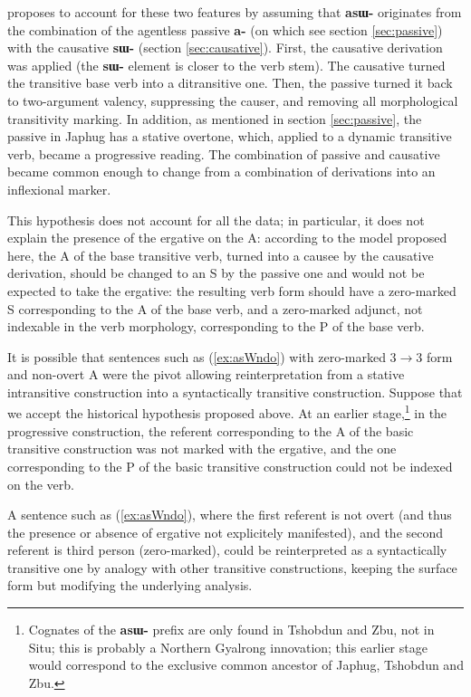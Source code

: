 \documentclass[oldfontcommands,oneside,a4paper,11pt]{article}
\newcommand{\ipa}[1]{\mbox{\phon\textbf{#1}}} %
\begin{document}
\citet{jacques16prog} proposes to account for these two features by assuming that \ipa{asɯ-} originates from the combination of the agentless passive \ipa{a-} (on which see section \ref{sec:passive}) with the causative \ipa{sɯ-} (section \ref{sec:causative}). First, the causative derivation was applied (the \ipa{sɯ-} element is closer to the verb stem). The causative turned the transitive base verb into a ditransitive one. Then, the passive turned it back to two-argument valency, suppressing the causer, and removing all morphological transitivity marking. In addition, as mentioned in section \ref{sec:passive}, the passive in Japhug  has a stative overtone, which, applied to a dynamic transitive verb, became a progressive reading. The combination of passive and causative became common enough to change from a combination of derivations into an inflexional marker.

This hypothesis does not account for all the data; in particular, it does not explain the presence of the ergative on the A: according to the model proposed here, the A of the base transitive verb, turned into a causee by the causative derivation, should be changed to an S by the passive one and would not be expected to take the ergative: the resulting verb form should have a zero-marked S corresponding to the A of the base verb, and a zero-marked adjunct, not indexable in the verb morphology, corresponding to the P of the base verb.  

It is possible that sentences such as (\ref{ex:asWndo}) with zero-marked 3$\rightarrow$3 form and non-overt A were the pivot allowing reinterpretation from a stative intransitive construction into a syntactically transitive construction. Suppose that we accept the historical hypothesis proposed above. At an earlier stage,\footnote{Cognates of the \ipa{asɯ-} prefix are only found in Tshobdun and Zbu, not in Situ; this is probably a Northern Gyalrong innovation; this earlier stage would correspond to the exclusive common ancestor of Japhug, Tshobdun and Zbu.} in the progressive construction, the referent corresponding to the A of the basic transitive construction was not marked with the ergative, and the one corresponding to the P of the basic transitive construction could not be indexed on the verb. 

A sentence such as (\ref{ex:asWndo}), where the first referent is not overt (and thus the presence or absence of ergative not explicitely manifested), and the second referent is third person (zero-marked),  could be reinterpreted as a syntactically transitive one by analogy with other transitive constructions, keeping the surface form but modifying the underlying analysis.
\end{document}
